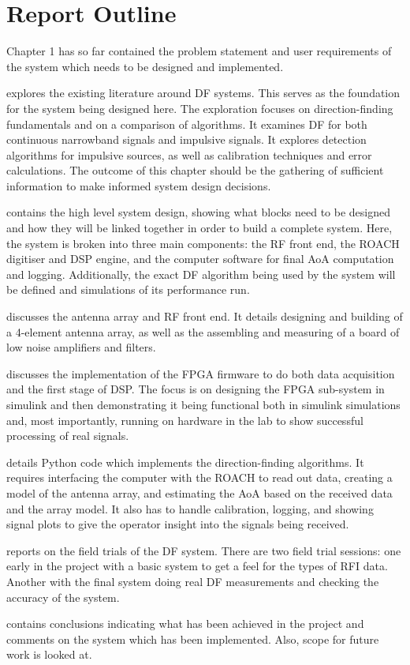 \section{Report Outline}
Chapter 1 has so far contained the problem statement and user requirements of the system which needs to be designed and implemented. 

 explores the existing literature around DF systems. This serves as the foundation for the system being designed here. The exploration focuses on direction-finding fundamentals and on a comparison of algorithms. It examines DF for both continuous narrowband signals and impulsive signals. It explores detection algorithms for impulsive sources, as well as calibration techniques and error calculations. The outcome of this chapter should be the gathering of sufficient information to make informed system design decisions.

 contains the high level system design, showing what blocks need to be designed and how they will be linked together in order to build a complete system. Here, the system is broken into three main components: the RF front end, the ROACH digitiser and DSP engine, and the computer software for final AoA computation and logging. Additionally, the exact DF algorithm being used by the system will be defined and simulations of its performance run.

 discusses the antenna array and RF front end. It details designing and building of a 4-element antenna array, as well as the assembling and measuring of a board of low noise amplifiers and filters.

 discusses the implementation of the FPGA firmware to do both data acquisition and the first stage of DSP. The focus is on designing the FPGA sub-system in simulink and then demonstrating it being functional both in simulink simulations and, most importantly, running on hardware in the lab to show successful processing of real signals.

 details Python code which implements the direction-finding algorithms. It requires interfacing the computer with the ROACH to read out data, creating a model of the antenna array, and estimating the AoA based on the received data and the array model. It also has to handle calibration, logging, and showing signal plots to give the operator insight into the signals being received.

 reports on the field trials of the DF system. There are two field trial sessions: one early in the project with a basic system to get a feel for the types of RFI data. Another with the final system doing real DF measurements and checking the accuracy of the system.

 contains conclusions indicating what has been achieved in the project and comments on the system which has been implemented. Also, scope for future work is looked at.
